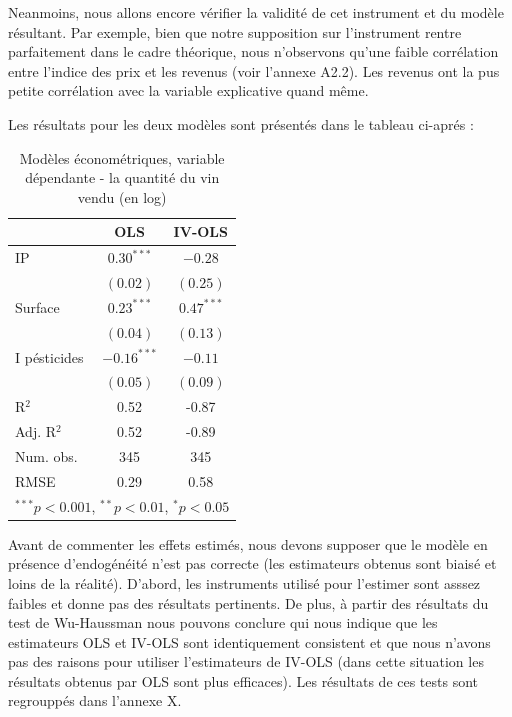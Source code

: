 \documentclass[11pt,]{article}
\begin{document}
Neanmoins, nous allons encore vérifier la validité de cet instrument et
du modèle résultant. Par exemple, bien que notre supposition sur
l'instrument rentre parfaitement dans le cadre théorique, nous
n'observons qu'une faible corrélation entre l'indice des prix et les
revenus (voir l'annexe A2.2). Les revenus ont la pus petite corrélation
avec la variable explicative quand même.

Les résultats pour les deux modèles sont présentés dans le tableau
ci-aprés :

\FloatBarrier

\begin{table}[!htbp]
\begin{center}
\begin{tabular}{l c c }
\hline
 & OLS & IV-OLS \\
\hline
IP           & $0.30^{***}$  & $-0.28$      \\
             & $(0.02)$      & $(0.25)$     \\
Surface      & $0.23^{***}$  & $0.47^{***}$ \\
             & $(0.04)$      & $(0.13)$     \\
I pésticides & $-0.16^{***}$ & $-0.11$      \\
             & $(0.05)$      & $(0.09)$     \\
\hline
R$^2$        & 0.52          & -0.87        \\
Adj. R$^2$   & 0.52          & -0.89        \\
Num. obs.    & 345           & 345          \\
RMSE         & 0.29          & 0.58         \\
\hline
\multicolumn{3}{l}{\scriptsize{$^{***}p<0.001$, $^{**}p<0.01$, $^*p<0.05$}}
\end{tabular}
\caption{Modèles économétriques, variable dépendante - la quantité du vin vendu (en log)}
\label{table : ols et ivols}
\end{center}
\end{table}

\FloatBarrier

Avant de commenter les effets estimés, nous devons supposer que le
modèle en présence d'endogénéité n'est pas correcte (les estimateurs
obtenus sont biaisé et loins de la réalité). D'abord, les instruments
utilisé pour l'estimer sont asssez faibles et donne pas des résultats
pertinents. De plus, à partir des résultats du test de Wu-Haussman nous
pouvons conclure qui nous indique que les estimateurs OLS et IV-OLS sont
identiquement consistent et que nous n'avons pas des raisons pour
utiliser l'estimateurs de IV-OLS (dans cette situation les résultats
obtenus par OLS sont plus efficaces). Les résultats de ces tests sont
regrouppés dans l'annexe X.
\end{document}
